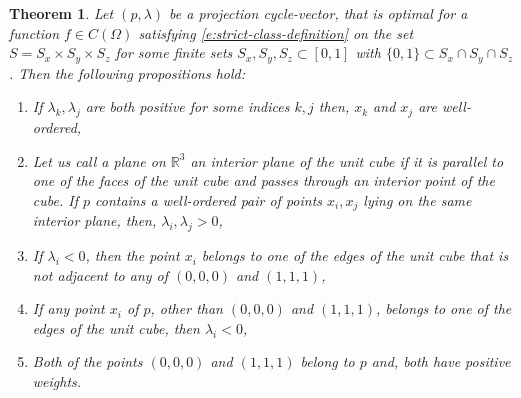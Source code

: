 \documentclass[10pt,a4paper]{amsart}
\newtheorem{theorem}{Theorem}
\begin{document}
\begin{theorem} \label{t: Theorem 2.2}
    Let \((p,\lambda)\) be a projection cycle-vector, that is optimal for a function \(f \in C(\Omega)\) satisfying \eqref{e:strict-class-definition} on the set \(S=S_x\times S_y\times S_z\) for some finite sets \(S_x, S_y, S_z \subset [0,1]\) with \(\{0,1\}\subset S_x \cap S_y \cap S_z\). Then the following propositions hold:
    \begin{enumerate}

        \item[(a)] If \(\lambda_k,\lambda_j\) are both positive for some indices \(k,j\) then, \(x_k\) and \(x_j\) are well-ordered,
        \item[(b)] Let us call a plane on \(\mathbb{R}^3\) an interior plane of the unit cube if it is parallel to one of the faces of the unit cube and passes through an interior point of the cube. If \(p\) contains a well-ordered pair of points  \(x_i,x_j\) lying on the same interior plane, then, \(\lambda_i, \lambda_j>0\),
        \item[(c)] If \(\lambda_i<0 \), then the point \(x_i\) belongs to one of the edges of the unit cube that is not adjacent to  any of \((0,0,0)\) and \((1,1,1)\),
        \item[(d)]  If any point \(x_i\) of \(p\), other than \((0,0,0)\) and \((1,1,1)\), belongs to one of the edges of the unit cube, then \(\lambda_i<0\),
        \item[(e)] Both of the points \((0,0,0)\) and \((1,1,1)\) belong to \(p\) and, both have positive weights.
    \end{enumerate}
\end{theorem}
\end{document}
